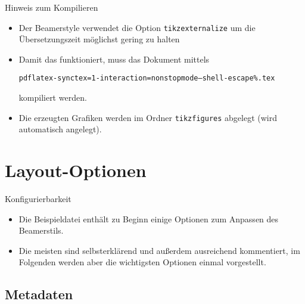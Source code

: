 \documentclass[hyperref={bookmarks=false},11pt,dvipsnames]{beamer}
\begin{document}
\begin{frame}[t]{Hinweis zum Kompilieren}
	\begin{itemize}
		\item Der Beamerstyle verwendet die Option \texttt{tikzexternalize} um die Übersetzungszeit möglichst gering zu halten

		\item Damit das funktioniert, muss das Dokument mittels
		      \begin{alltt}
			      \scriptsize
			      pdflatex -synctex=1 -interaction=nonstopmode --shell-escape \%.tex
		      \end{alltt}
		      kompiliert werden.

		\item Die erzeugten Grafiken werden im Ordner \texttt{tikzfigures} abgelegt (wird automatisch angelegt).
	\end{itemize}
\end{frame}

\section{Layout-Optionen}

\begin{frame}[t]{Konfigurierbarkeit}
	\begin{itemize}
		\item Die Beispieldatei enthält zu Beginn einige Optionen zum Anpassen des Beamerstils.

		\item Die meisten sind selbsterklärend und außerdem ausreichend kommentiert, im Folgenden werden aber die wichtigsten Optionen einmal vorgestellt.
	\end{itemize}
\end{frame}


\subsection{Metadaten}
\end{document}
